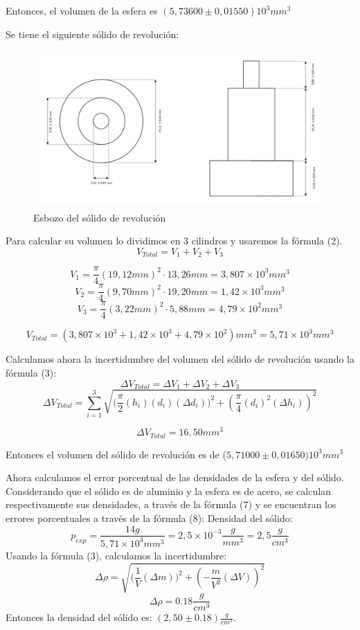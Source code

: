 \documentclass[a4paper]{article}
\begin{document}
Entonces, el volumen de la esfera es $(5,73600\pm 0,01550)10^3  mm^3$

Se tiene el siguiente sólido de revolución:
\begin{figure}[H]
  \centering
  \includegraphics[width=11.5cm, height=6cm]{Solido_de_revolucion.png}
  \caption{Esbozo del sólido de revolución}
\end{figure}

Para calcular su volumen lo dividimos en 3 cilindros y usaremos la fórmula (2).
\[V_{Total}=V_1+V_2+V_3\]

\[V_1= \frac{\pi}{4}(19,12mm)^2\cdot 13,26mm=3,807
\times 10^3 mm^3\]
\[V_2= \frac{\pi}{4}(9,70mm)^2\cdot 19,20mm=1,42\times 10^3 mm^3\]
\[V_3= \frac{\pi}{4}(3,22mm)^2\cdot 5,88mm=4,79\times 10^2 mm^3\]

\[V_{Total}=(3,807\times 10^3+1,42\times 10^3+4,79\times 10^2)mm^3=5,71\times 10^3 mm^3\]

Calculamos ahora la incertidumbre del volumen del sólido de revolución usando la fórmula (3):
\[\Delta {V_{Total}}=\Delta {V_1}+\Delta {V_2}+\Delta {V_3} \]
\[\Delta{V_{Total}}= \displaystyle\sum_{i=1}^{3} \sqrt{({\frac{\pi}{2} (h_i)(d_i)(\Delta{d_i}))^2+  (\frac{\pi}{4} (d_i)^2 (\Delta{h_i}))^2}}\]

\[\Delta {V_{Total}}= 16,50 mm^3\]

Entonces el volumen del sólido de revolución es de ($5,71000 \pm {0,01650}) 10^3 mm^3 $

Ahora calculamos el error porcentual de las densidades de la esfera y del sólido. Considerando que el sólido es de aluminio y la esfera es de acero, se calculan respectivamente sus densidades, a través de la fórmula (7) y se encuentran los errores porcentuales a través de la fórmula (8):
Densidad del sólido:
\[p_{exp}=\frac{14g}{5,71\times 10^3 mm^3 }= 2,5 \times 10^{-3} \frac{g}{mm^3}=2,5\frac{g}{cm^3}\]
Usando la fórmula (3), calculamos la incertidumbre:
\[\Delta \rho=\sqrt{({\frac{1}{V}(\Delta{m}))^2+  (-\frac{m}{V^2} (\Delta{V}))^2}}\]
\[\Delta \rho=0.18 \frac{g}{cm^3}\]
Entonces la densidad del sólido es: $(2,50\pm0.18) \frac{g}{cm^3}$.
\end{document}
